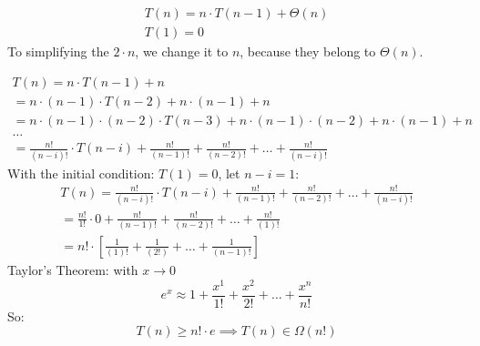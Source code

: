 \documentclass[a4paper]{article}
\begin{document}
\begin{gather*}
    T(n) = n \cdot T(n-1) + \Theta(n) \\
    T(1) = 0
\end{gather*}
To simplifying the $2 \cdot n$, we change it to $n$, because they belong to $ \Theta(n)$. \par
\begin{gather*}
    T(n) = n \cdot T(n-1)+n \\
    = n \cdot (n-1) \cdot T(n-2) + n \cdot (n-1) + n \\
    = n \cdot (n-1) \cdot (n-2) \cdot T(n-3) + n \cdot (n-1) \cdot (n-2) + n \cdot (n-1) + n \\
    \ldots \\
    = \frac{n!}{(n-i)!} \cdot T(n-i) + \frac{n!}{(n-1)!} +  \frac{n!}{(n-2)!} + \ldots + \frac{n!}{(n-i)!}
\end{gather*}
With the initial condition: $T(1) = 0$, let $n-i=1:$
\begin{gather*}
        T(n) = \frac{n!}{(n-i)!} \cdot T(n-i) + \frac{n!}{(n-1)!} +  \frac{n!}{(n-2)!} + \ldots + \frac{n!}{(n-i)!} \\
    = \frac{n!}{1!} \cdot 0 + \frac{n!}{(n-1)!} + \frac{n!}{(n-2)!} + \ldots + \frac{n!}{(1)!} \\ 
    = n! \cdot [\frac{1}{(1)!} + \frac{1}{(2!)} + \ldots + \frac{1}{(n-1)!}]
\end{gather*}
Taylor's Theorem: with $x \rightarrow 0$
\begin{equation*}
    e^x \approx 1 + \frac{x^1}{1!} + \frac{x^2}{2!} + \ldots + \frac{x^n}{n!}
\end{equation*}
So:
\begin{equation*}
    T(n) \geq n! \cdot e \implies T(n) \in \Omega (n!)
\end{equation*}
\newpage
\end{document}
